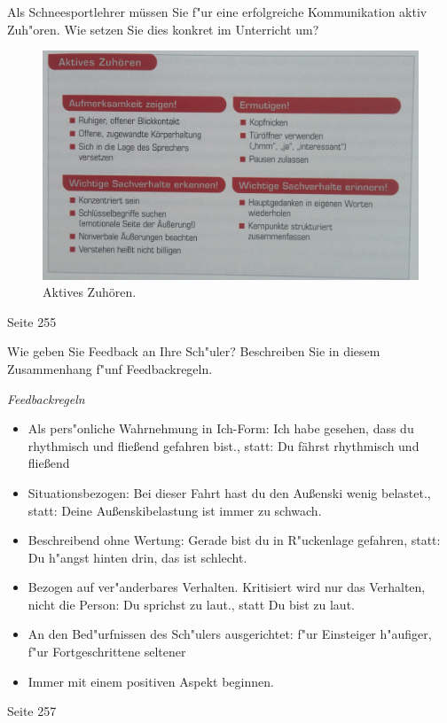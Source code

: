 \begin{question}{6}
Als Schneesportlehrer müssen Sie f"ur eine erfolgreiche Kommunikation aktiv Zuh"oren. Wie setzen Sie dies konkret im Unterricht um?
\end{question}
\begin{solution}
\begin{figure}[H]
  \centering
  \includegraphics[width=12cm]{pic/zuhoeren.jpg}
  \caption{Aktives Zuhören.}
  \label{fig:zuhoeren}
\end{figure}
 Seite 255
\end{solution}

\begin{question}{6}
Wie geben Sie Feedback an Ihre Sch"uler? Beschreiben Sie in diesem Zusammenhang f"unf Feedbackregeln.
\end{question}
\begin{solution}
\emph{Feedbackregeln}
\begin{itemize}
\item Als pers"onliche Wahrnehmung in Ich-Form: Ich habe gesehen, dass du rhythmisch und fließend gefahren bist., statt: Du fährst rhythmisch und fließend
\item Situationsbezogen: Bei dieser Fahrt hast du den Außenski wenig belastet., statt: Deine Außenskibelastung ist immer zu schwach.
\item Beschreibend ohne Wertung: Gerade bist du in R"uckenlage gefahren, statt: Du h"angst hinten drin, das ist schlecht.
\item Bezogen auf ver"anderbares Verhalten. Kritisiert wird nur das Verhalten, nicht die Person: Du sprichst zu laut., statt Du bist zu laut.
\item An den Bed"urfnissen des Sch"ulers ausgerichtet: f"ur Einsteiger h"aufiger, f"ur Fortgeschrittene seltener
\item Immer mit einem positiven Aspekt beginnen.
\end{itemize}
 Seite 257
\end{solution}

